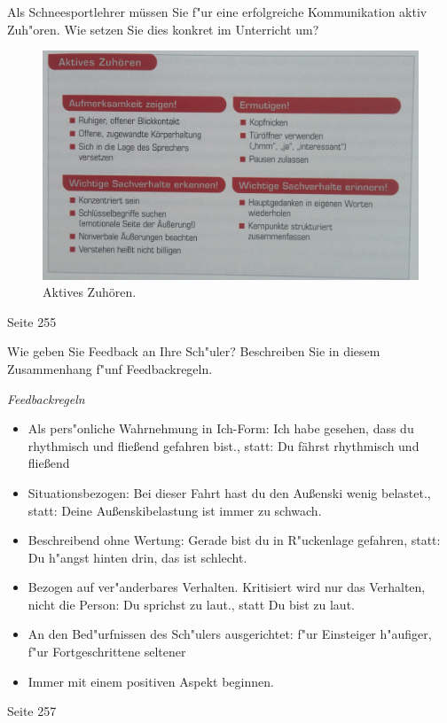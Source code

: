 \begin{question}{6}
Als Schneesportlehrer müssen Sie f"ur eine erfolgreiche Kommunikation aktiv Zuh"oren. Wie setzen Sie dies konkret im Unterricht um?
\end{question}
\begin{solution}
\begin{figure}[H]
  \centering
  \includegraphics[width=12cm]{pic/zuhoeren.jpg}
  \caption{Aktives Zuhören.}
  \label{fig:zuhoeren}
\end{figure}
 Seite 255
\end{solution}

\begin{question}{6}
Wie geben Sie Feedback an Ihre Sch"uler? Beschreiben Sie in diesem Zusammenhang f"unf Feedbackregeln.
\end{question}
\begin{solution}
\emph{Feedbackregeln}
\begin{itemize}
\item Als pers"onliche Wahrnehmung in Ich-Form: Ich habe gesehen, dass du rhythmisch und fließend gefahren bist., statt: Du fährst rhythmisch und fließend
\item Situationsbezogen: Bei dieser Fahrt hast du den Außenski wenig belastet., statt: Deine Außenskibelastung ist immer zu schwach.
\item Beschreibend ohne Wertung: Gerade bist du in R"uckenlage gefahren, statt: Du h"angst hinten drin, das ist schlecht.
\item Bezogen auf ver"anderbares Verhalten. Kritisiert wird nur das Verhalten, nicht die Person: Du sprichst zu laut., statt Du bist zu laut.
\item An den Bed"urfnissen des Sch"ulers ausgerichtet: f"ur Einsteiger h"aufiger, f"ur Fortgeschrittene seltener
\item Immer mit einem positiven Aspekt beginnen.
\end{itemize}
 Seite 257
\end{solution}

